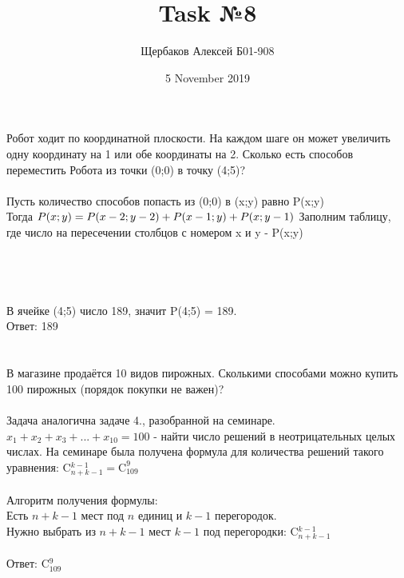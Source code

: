 \documentclass{article}
\title{Task №8}
\author{Щербаков Алексей Б01-908}
\date{5 November 2019}
\begin{document}
\maketitle
\section{}
Робот ходит по координатной плоскости. На каждом шаге он может увеличить одну координату на 1 или обе координаты на 2. Сколько есть способов переместить Робота из точки (0;0) в точку (4;5)?\\\\
Пусть количество способов попасть из (0;0) в (x;y) равно P(x;y)\\
Тогда $P(x;y) = P(x-2;y-2) + P(x-1;y) + P(x;y-1)\\$
Заполним таблицу, где число на пересечении столбцов с номером x и y - P(x;y)\\\\
\\\\
\\В ячейке (4;5) число 189, значит P(4;5) = 189.\\
Ответ: 189
\section{}
В магазине продаётся 10 видов пирожных. Сколькими способами можно купить 100 пирожных (порядок покупки не важен)?\\\\
Задача аналогична задаче 4., разобранной на семинаре.  $x_1+x_2+x_3+...+x_{10}=100$ - найти число решений в неотрицательных целых числах. На семинаре была получена формула для количества решений такого уравнения: C$^{k-1}_{n+k-1}=\text{C}^{9}_{109}$\\
\\Алгоритм получения формулы: \\Есть $n+k-1$ мест под $n$ единиц и $k-1$ перегородок. \\Нужно выбрать из $n+k-1$ мест $k-1$ под перегородки: C$^{k-1}_{n+k-1}$\\
\\Ответ: C$^{9}_{109}$
\end{document}
